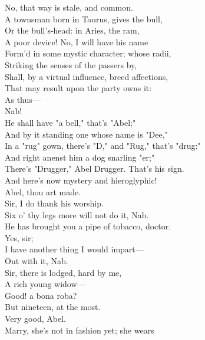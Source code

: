 \documentclass[a4paper,oneside]{memoir}
\begin{document}
\begin{drama*}
\subtlespeaks {} No, that way is stale, and common.\\
A townsman born in Taurus, gives the bull,\\
Or the bull's-head: in Aries, the ram,\\
A poor device! No, I will have his name\\
Form'd in some mystic character; whose radii,\\
Striking the senses of the passers by,\\
Shall, by a virtual influence, breed affections,\\
That may result upon the party owns it:\\
As thus---\\
\facespeaks {} Nab!\\
\subtlespeaks {} He shall have "a bell," that's "Abel;"\\
And by it standing one whose name is "Dee,"\\
In a "rug" gown, there's "D," and "Rug," that's "drug:"\\
And right anenst him a dog snarling "er;"\\
There's "Drugger," Abel Drugger. That's his sign.\\
And here's now mystery and hieroglyphic!\\
\facespeaks Abel, thou art made.\\
\druggerspeaks {} Sir, I do thank his worship.\\
\facespeaks Six o' thy legs more will not do it, Nab.\\
He has brought you a pipe of tobacco, doctor.\\
\druggerspeaks {} Yes, sir;\\
I have another thing I would impart---\\
\facespeaks Out with it, Nab.\\
\druggerspeaks {} Sir, there is lodged, hard by me,\\
A rich young widow---\\
\facespeaks {} Good! a bona roba?\\
\druggerspeaks But nineteen, at the most.\\
\facespeaks {} Very good, Abel.\\
\druggerspeaks Marry, she's not in fashion yet; she wears\\

\end{drama*}
\end{document}
